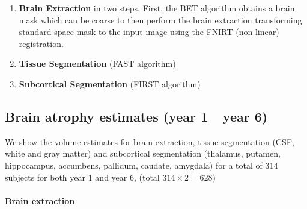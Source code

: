 \documentclass[11pt]{article}
\theoremstyle{definition}
\theoremstyle{remark}
\begin{document}
\begin{enumerate}
  \item \textbf{Brain Extraction} in two steps. First, the BET algorithm obtains a brain mask which can be coarse to then perform the brain extraction transforming standard-space mask to the input image using the FNIRT (non-linear) registration.
  \item \textbf{Tissue Segmentation} (FAST algorithm)
  \item \textbf{Subcortical Segmentation} (FIRST algorithm)
\end{enumerate}

\subsection{Brain atrophy estimates (year 1 $~$ year 6) }
\label{sse:segementa}

We show the volume estimates for brain extraction, tissue segmentation (CSF, white and gray matter) and subcortical segmentation (thalamus, putamen, hippocampus, accumbens, pallidum, caudate, amygdala) for a total of 314 subjects for both year 1 and year 6, (total $314 \times 2 = 628$)

\paragraph*{Brain extraction}
\end{document}

